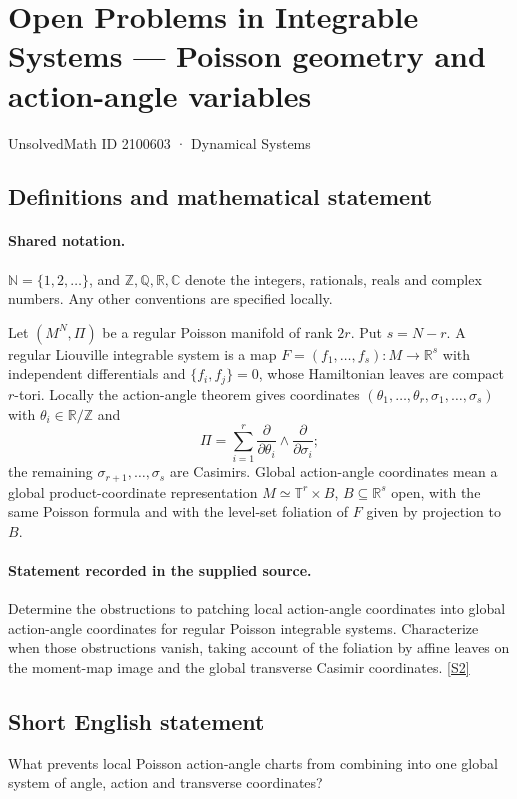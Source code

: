 \documentclass[11pt]{article}
\newcommand{\sref}[2]{\hyperlink{source:#1:#2}{[S#2]}}
\begin{document}
\setcounter{section}{2100602}
\section{Open Problems in Integrable Systems — Poisson geometry and action-angle variables}\label{2100603}
{\small\sffamily UnsolvedMath ID 2100603 · Dynamical Systems}
\subsection{Definitions and mathematical statement}

\paragraph{Shared notation.}$\mathbb N=\{1,2,\ldots\}$, and $\mathbb Z,\mathbb Q,\mathbb R,\mathbb C$ denote the integers, rationals, reals and complex numbers. Any other conventions are specified locally.


Let $(M^N,\Pi)$ be a regular Poisson manifold of rank $2r$. Put $s=N-r$. A regular Liouville integrable system is a map $F=(f_1,\ldots,f_s):M\to\mathbb R^s$ with independent differentials and $\{f_i,f_j\}=0$, whose Hamiltonian leaves are compact $r$-tori. Locally the action-angle theorem gives coordinates $(\theta_1,\ldots,\theta_r,\sigma_1,\ldots,\sigma_s)$ with $\theta_i\in\mathbb R/\mathbb Z$ and
\[\Pi=\sum_{i=1}^r\frac{\partial}{\partial\theta_i}\wedge\frac{\partial}{\partial\sigma_i};\]
the remaining $\sigma_{r+1},\ldots,\sigma_s$ are Casimirs. Global action-angle coordinates mean a global product-coordinate representation $M\simeq\mathbb T^r\times B$, $B\subseteq\mathbb R^s$ open, with the same Poisson formula and with the level-set foliation of $F$ given by projection to $B$.
\paragraph{Statement recorded in the supplied source.}
Determine the obstructions to patching local action-angle coordinates into global action-angle coordinates for regular Poisson integrable systems. Characterize when those obstructions vanish, taking account of the foliation by affine leaves on the moment-map image and the global transverse Casimir coordinates. \sref{2100603}{2}
\subsection{Short English statement}
What prevents local Poisson action-angle charts from combining into one global system of angle, action and transverse coordinates?
\end{document}
